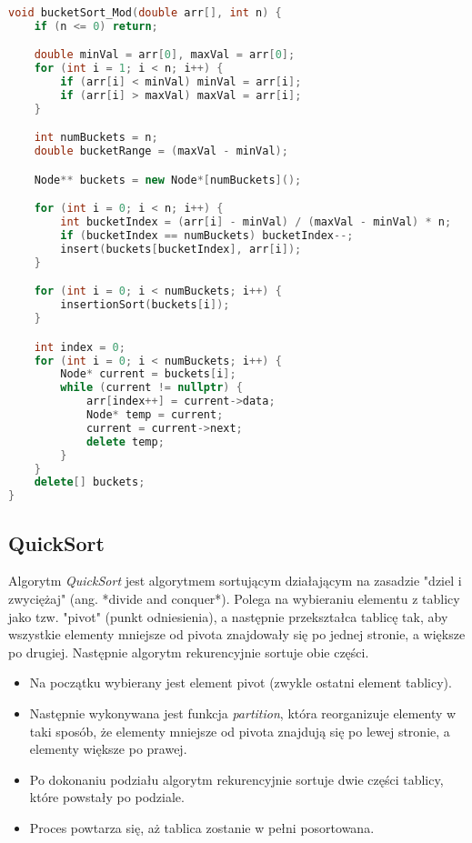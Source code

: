 \documentclass[a4paper,12pt]{article}
\begin{document}
\begin{lstlisting}[language=C++,caption=Bucket sort z obsługą liczb spoza zakresu 0-1]
void bucketSort_Mod(double arr[], int n) {
    if (n <= 0) return;

    double minVal = arr[0], maxVal = arr[0];
    for (int i = 1; i < n; i++) {
        if (arr[i] < minVal) minVal = arr[i];
        if (arr[i] > maxVal) maxVal = arr[i];
    }

    int numBuckets = n;
    double bucketRange = (maxVal - minVal);

    Node** buckets = new Node*[numBuckets]();

    for (int i = 0; i < n; i++) {
        int bucketIndex = (arr[i] - minVal) / (maxVal - minVal) * n;
        if (bucketIndex == numBuckets) bucketIndex--;
        insert(buckets[bucketIndex], arr[i]);
    }

    for (int i = 0; i < numBuckets; i++) {
        insertionSort(buckets[i]);
    }

    int index = 0;
    for (int i = 0; i < numBuckets; i++) {
        Node* current = buckets[i];
        while (current != nullptr) {
            arr[index++] = current->data;
            Node* temp = current;
            current = current->next;
            delete temp;
        }
    }
    delete[] buckets;
}
\end{lstlisting}
\newpage
\subsection{QuickSort}
Algorytm \textit{QuickSort} jest algorytmem sortującym działającym na zasadzie "dziel i zwyciężaj" (ang. *divide and conquer*). Polega na wybieraniu elementu z tablicy jako tzw. "pivot" (punkt odniesienia), a następnie przekształca tablicę tak, aby wszystkie elementy mniejsze od pivota znajdowały się po jednej stronie, a większe po drugiej. Następnie algorytm rekurencyjnie sortuje obie części.

\begin{itemize}
    \item Na początku wybierany jest element pivot (zwykle ostatni element tablicy).
    \item Następnie wykonywana jest funkcja \textit{partition}, która reorganizuje elementy w taki sposób, że elementy mniejsze od pivota znajdują się po lewej stronie, a elementy większe po prawej.
    \item Po dokonaniu podziału algorytm rekurencyjnie sortuje dwie części tablicy, które powstały po podziale.
    \item Proces powtarza się, aż tablica zostanie w pełni posortowana.
\end{itemize}
\end{document}
